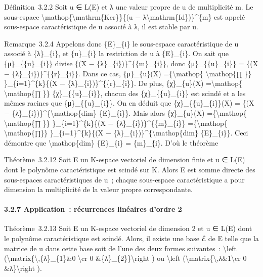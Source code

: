 \documentclass[]{article}
\begin{document}
Définition~3.2.2 Soit u ∈ L(E) et λ une valeur propre de u de
multiplicité m. Le sous-espace
\textbackslash{}mathop\{\textbackslash{}mathrm\{Ker\}\}\{(u −
λ\textbackslash{}mathrm\{Id\})\}\^{}\{m\} est appelé sous-espace
caractéristique de u associé à λ, il est stable par u.

Remarque~3.2.4 Appelons donc \{E\}\_\{i\} le sous-espace caractéristique
de u associé à \{λ\}\_\{i\}, et \{u\}\_\{i\} la restriction de u à
\{E\}\_\{i\}. On sait que \{μ\}\_\{\{u\}\_\{i\}\} divise \{(X −
\{λ\}\_\{i\})\}\^{}\{\{m\}\_\{i\}\}, donc \{μ\}\_\{\{u\}\_\{i\}\} = \{(X
− \{λ\}\_\{i\})\}\^{}\{\{r\}\_\{i\}\}. Dans ce cas, \{μ\}\_\{u\}(X)
=\{\textbackslash{}mathop\{ \textbackslash{}mathop\{∏ \}\}
\}\_\{i=1\}\^{}\{k\}\{(X − \{λ\}\_\{i\})\}\^{}\{\{r\}\_\{i\}\}. De plus,
\{χ\}\_\{u\}(X) =\textbackslash{}mathop\{ \textbackslash{}mathop\{∏ \}\}
\{χ\}\_\{\{u\}\_\{i\}\}, chacun des \{χ\}\_\{\{u\}\_\{i\}\} est scindé
et a les mêmes racines que \{μ\}\_\{\{u\}\_\{i\}\}. On en déduit que
\{χ\}\_\{\{u\}\_\{i\}\}(X) = \{(X −
\{λ\}\_\{i\})\}\^{}\{\textbackslash{}mathop\{dim\} \{E\}\_\{i\}\}. Mais
alors \{χ\}\_\{u\}(X) =\{\textbackslash{}mathop\{
\textbackslash{}mathop\{∏ \}\} \}\_\{i=1\}\^{}\{k\}\{(X −
\{λ\}\_\{i\})\}\^{}\{\{m\}\_\{i\}\} =\{\textbackslash{}mathop\{
\textbackslash{}mathop\{∏\}\} \}\_\{i=1\}\^{}\{k\}\{(X −
\{λ\}\_\{i\})\}\^{}\{\textbackslash{}mathop\{dim\} \{E\}\_\{i\}\}. Ceci
démontre que \textbackslash{}mathop\{dim\} \{E\}\_\{i\} = \{m\}\_\{i\}.
D'où le théorème

Théorème~3.2.12 Soit E un K-espace vectoriel de dimension finie et u ∈
L(E) dont le polynôme caractéristique est scindé sur K. Alors E est
somme directe des sous-espaces caractéristiques de u~; chaque
sous-espace caractéristique a pour dimension la multiplicité de la
valeur propre correspondante.

\paragraph{3.2.7 Application~: récurrences linéaires d'ordre 2}

Théorème~3.2.13 Soit E un K-espace vectoriel de dimension 2 et u ∈ L(E)
dont le polynôme caractéristique est scindé. Alors, il existe une base ℰ
de E telle que la matrice de u dans cette base soit de l'une des deux
formes suivantes~: \textbackslash{}left
(\textbackslash{}matrix\{\textbackslash{},\{λ\}\_\{1\}\&0
\textbackslash{}cr 0 \&\{λ\}\_\{2\}\}\textbackslash{}right ) ou
\textbackslash{}left
(\textbackslash{}matrix\{\textbackslash{},λ\&1\textbackslash{}cr 0
\&λ\}\textbackslash{}right ).
\end{document}
